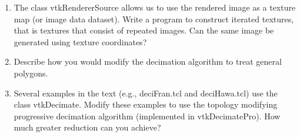 \begin{enumerate}
\item The class vtkRendererSource allows us to use the rendered image as a texture map (or image data dataset). Write a program to construct iterated textures, that is textures that consist of repeated images. Can the same image be generated using texture coordinates?

\item Describe how you would modify the decimation algorithm to treat general polygons.

\item Several examples in the text (e.g., deciFran.tcl and deciHawa.tcl) use the class vtkDecimate. Modify these examples to use the topology modifying progressive decimation algorithm (implemented in vtkDecimatePro). How much greater reduction can you achieve?


\end{enumerate}